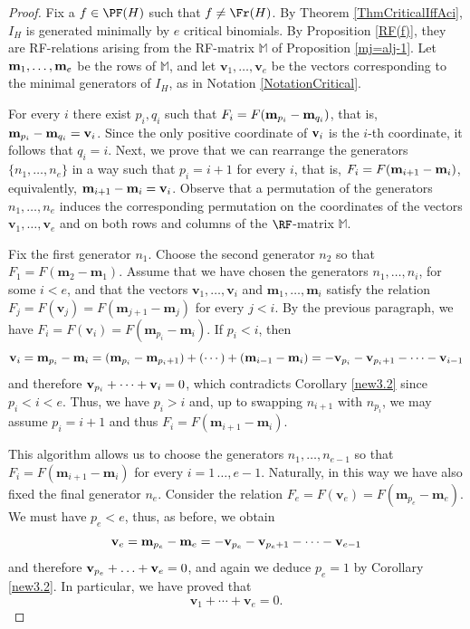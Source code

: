 \documentclass[11pt,twoside]{amsart}
\newcommand{\MM}{\mathbb M}
\def\bv{{\mathbf v}}
\def\bm{{\mathbf m}}
\def\bbM{{\mathbb M}}
\theoremstyle{definition}
\numberwithin{equation}{section}
\begin{document}
\begin{proof}
Fix a $f \in \PF(H)$ such that $f \ne \Fr(H)$.
By Theorem \ref{ThmCriticalIffAci}, $I_H$ is generated minimally by $e$ critical binomials. 
By Proposition \ref{RF(f)},
they are RF-relations arising from
the RF-matrix $\bbM$ of Proposition \ref{mj=alj-1}. 
Let ${\bf m}_1,\ldots,{\bf m}_e$ be the rows of $\bbM$, and let $\bv_1, \ldots, \bv_e$ be the vectors corresponding to the minimal generators of $I_H$, 
as in Notation \ref{NotationCritical}.

For every $i$ there exist  $p_i,q_i$ such that $F_i = F({\bf m}_{p_i}-{\bf m}_{q_i})$, that is, ${\bf m}_{p_i}-{\bf m}_{q_i}={\bf v}_i$. 
Since the only positive coordinate of ${\bf v}_i$ is the $i$-th coordinate, it follows that $q_i=i$. 
Next, we prove that we can rearrange the generators $\{n_1,\ldots,n_e \}$ in a way such that $p_i=i+1$ for every $i$, that is, $F_i = F({\bf m}_{i+1}-{\bf m}_i)$, equivalently, ${\bf m}_{i+1}-{\bf m}_i = {\bf v}_i$.  
Observe that a permutation of the generators $n_1, \ldots, n_e$ induces the corresponding permutation on the coordinates of the vectors $\bv_1,\ldots,\bv_e$ and on both rows and columns of the $\RF$-matrix $\MM$.

Fix the first generator $n_1$.  
Choose the second generator $n_2$ so that  $F_1=F(\bm_2-\bm_1)$. 
Assume that we have chosen the  generators $n_1,\ldots,n_i$, for some $i < e$, 
and that the vectors $\bv_1,\ldots,\bv_i$ and $\bm_1,\ldots,\bm_i$ satisfy  the relation $F_j=F(\bv_j)=F(\bm_{j+1}-\bm_{j})$  for every $j < i$. 
By the previous paragraph, we have $F_i = F(\bv_i)=F(\bm_{p_i}-\bm_i)$. 
If $p_i < i$,
then $${\bf v}_i = {\bf m}_{p_i}-{\bf m}_i= ({\bf m}_{p_i}-{\bf m}_{p_i+1})+ (\cdots) + ({\bf m}_{i-1} - {\bf m}_i)= -{\bf v}_{p_i} - {\bf v}_{p_i+1} - \cdots - {\bf v}_{i-1}$$
and therefore ${\bf v}_{p_i}+\cdots+{\bf v}_i = 0$, 
which contradicts Corollary \ref{new3.2} since
 $p_i < i < e$. 
Thus, we have $p_i > i$ and, up to swapping $n_{i+1}$ with $n_{p_i}$, we may assume $p_i = i+1$ and thus  $F_i = F(\bm_{i+1}-\bm_i)$.

This algorithm allows us to choose the generators $n_1,\ldots,n_{e-1}$ so that  $F_i =F(\bm_{i+1}-\bm_i)$ for every $i=1\,\ldots,e-1$. 
Naturally, in this way we have also fixed the final generator $n_e$.
Consider the relation $F_e = F(\bv_e)=F(\bm_{p_e}-\bm_e)$.
We must have $p_e < e$, thus, as before, 
  we obtain
$${\bf v}_e ={\bf m}_{p_e}-{\bf m}_e=-{\bf v}_{p_e} - {\bf v}_{p_e+1} - \cdots - {\bf v}_{e-1}$$
and therefore 
${\bf v}_{p_e}+\ldots+{\bf v}_e = 0$, and again  we deduce $p_e=1$ by Corollary \ref{new3.2}. 
In particular, we have proved that 
$$
\bv_1 + \cdots + \bv_e = 0.
$$


\end{proof}
\end{document}
